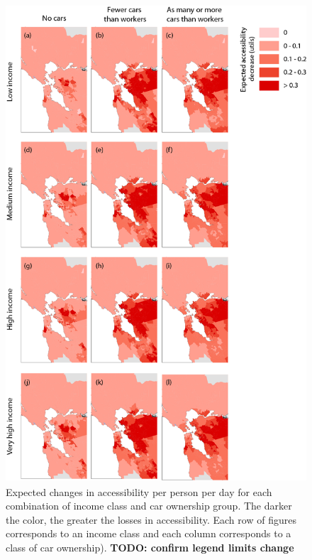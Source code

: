 \begin{figure}[ht!]
    \centering
    \includegraphics[height=7in]{FIGS/accByGroup.png}
\caption{Expected changes in accessibility per person per day for each combination of income class and car ownership group. The darker the color, the greater the losses in accessibility. Each row of figures corresponds to an income class and each column corresponds to a class of car ownership). \bf{TODO: confirm legend limits change}}%
\label{fig:acc_by_segment}
\end{figure}


